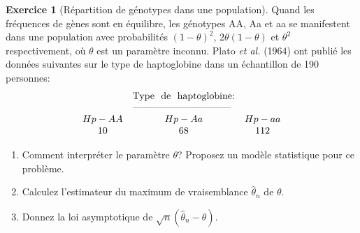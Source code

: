 \documentclass[a4paper,11pt,fleqn]{article}
\newcommand{\dlim}{\ensuremath{\stackrel{\mathcal{L}}{\longrightarrow}}}
\theoremstyle{definition}
\newtheorem{exercice}{Exercice}
\begin{document}
{}

\begin{exercice}[R\'epartition de g\'enotypes dans une population]
  Quand les fr\'equences de g\`enes sont en \'equilibre, les g\'enotypes AA, Aa
  et aa se manifestent dans une population avec probabilit\'es $(1-\theta)^2$,
  $2\theta(1-\theta)$ et $\theta^2$ respectivement, o\`u $\theta$ est un
  param\`etre inconnu. Plato {\it et al.} (1964) ont publi\'e les donn\'ees
  suivantes sur le type de haptoglobine dans un \'echantillon de 190 personnes:
$$
\begin{array}{ccc}
&\text{Type \ de \ haptoglobine:}&\\\hspace{6mm}
&\text{------------------------------ }&\\
 Hp-AA& Hp-Aa & Hp-aa \\
 10&68&112
\end{array}
$$
\begin{enumerate}
\item Comment interpr\'eter le param\`etre $\theta$? Proposez un mod\`ele statistique pour ce probl\`eme.
\item  Calculez l'estimateur du maximum de vraisemblance $\hat \theta_n$ de $\theta$.
\item  Donnez la loi asymptotique de $\sqrt{n}(\hat \theta_n -
\theta)$.
\end{enumerate}
\end{exercice}
\end{document}

